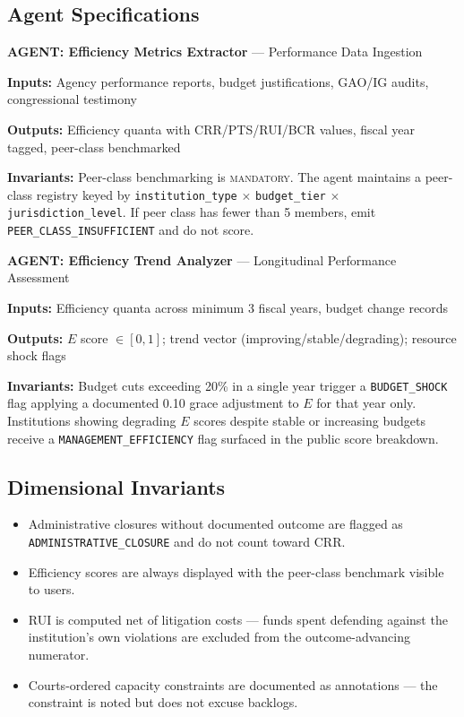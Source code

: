 \documentclass[a4paper,11pt]{article}
\begin{document}
	\subsection{Agent Specifications}
	
	\begin{agentbox}
		\textbf{\sffamily\color{navy} AGENT: Efficiency Metrics Extractor} — Performance Data Ingestion
		
		\medskip
		\textbf{Inputs:} Agency performance reports, budget justifications, GAO/IG audits, congressional testimony
		
		\textbf{Outputs:} Efficiency quanta with CRR/PTS/RUI/BCR values, fiscal year tagged, peer-class benchmarked
		
		\textbf{Invariants:} Peer-class benchmarking is \textsc{mandatory}. The agent maintains a peer-class registry keyed by \texttt{institution\_type} $\times$ \texttt{budget\_tier} $\times$ \texttt{jurisdiction\_level}. If peer class has fewer than 5 members, emit \texttt{PEER\_CLASS\_INSUFFICIENT} and do not score.
	\end{agentbox}
	
	\medskip
	
	\begin{agentbox}
		\textbf{\sffamily\color{navy} AGENT: Efficiency Trend Analyzer} — Longitudinal Performance Assessment
		
		\medskip
		\textbf{Inputs:} Efficiency quanta across minimum 3 fiscal years, budget change records
		
		\textbf{Outputs:} $E$ score $\in [0,1]$; trend vector (improving/stable/degrading); resource shock flags
		
		\textbf{Invariants:} Budget cuts exceeding 20\% in a single year trigger a \texttt{BUDGET\_SHOCK} flag applying a documented 0.10 grace adjustment to $E$ for that year only. Institutions showing degrading $E$ scores despite stable or increasing budgets receive a \texttt{MANAGEMENT\_EFFICIENCY} flag surfaced in the public score breakdown.
	\end{agentbox}
	
	\subsection{Dimensional Invariants}
	
	\begin{itemize}[leftmargin=1.5em]
		\item Administrative closures without documented outcome are flagged as \texttt{ADMINISTRATIVE\_CLOSURE} and do not count toward CRR.
		\item Efficiency scores are always displayed with the peer-class benchmark visible to users.
		\item RUI is computed net of litigation costs — funds spent defending against the institution's own violations are excluded from the outcome-advancing numerator.
		\item Courts-ordered capacity constraints are documented as annotations — the constraint is noted but does not excuse backlogs.
	\end{itemize}
	
\end{document}
